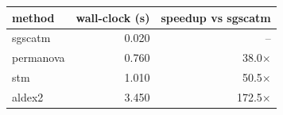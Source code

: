 \begin{tabular}{lrr}
\toprule
method & wall-clock (s) & speedup vs sgscatm \\
\midrule
sgscatm & 0.020 & -- \\
permanova & 0.760 & 38.0$\times$ \\
stm & 1.010 & 50.5$\times$ \\
aldex2 & 3.450 & 172.5$\times$ \\
\bottomrule
\end{tabular}
